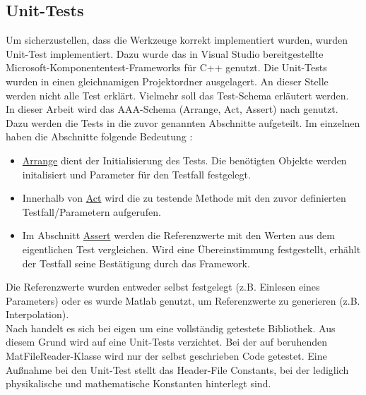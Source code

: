 \subsection{Unit-Tests}
Um sicherzustellen, dass die Werkzeuge korrekt implementiert wurden, wurden Unit-Test implementiert. Dazu wurde das in Visual Studio bereitgestellte Microsoft-Komponententest-Frameworks für C++ genutzt. Die Unit-Tests wurden in einen gleichnamigen Projektordner ausgelagert. An dieser Stelle werden nicht alle Test erklärt. Vielmehr soll das Test-Schema erläutert werden.\\ In dieser Arbeit wird das AAA-Schema  (Arrange, Act, Assert) nach \cite{Microsoft.2018}  genutzt. Dazu werden die Tests in die zuvor genannten Abschnitte aufgeteilt. Im einzelnen haben die Abschnitte folgende Bedeutung \cite{Microsoft.2018}: 
\begin{itemize}
	\item  \underline{Arrange} dient der Initialisierung des Tests. Die benötigten Objekte werden initalisiert und Parameter für den Testfall festgelegt.   
	
	\item  Innerhalb von \underline{Act} wird die zu testende Methode mit den zuvor definierten Testfall/Parametern aufgerufen.
	
	\item Im Abschnitt \underline{Assert} werden die Referenzwerte mit den Werten aus dem eigentlichen Test vergleichen. Wird eine Übereinstimmung festgestellt, erhählt der Testfall seine Bestätigung durch das Framework.
\end{itemize}
Die Referenzwerte wurden entweder selbst festgelegt (z.B. Einlesen eines Parameters) oder es wurde Matlab genutzt, um Referenzwerte zu generieren (z.B. Interpolation). \\
Nach \cite{TuxFamily.2018} handelt es sich bei eigen um eine vollständig getestete Bibliothek. Aus diesem Grund wird auf eine Unit-Tests verzichtet. Bei der auf \cite{Hulbert.2013} beruhenden MatFileReader-Klasse wird nur der selbst geschrieben Code getestet. Eine Außnahme bei den Unit-Test stellt das Header-File Constants, bei der lediglich physikalische und mathematische Konstanten hinterlegt sind. 

